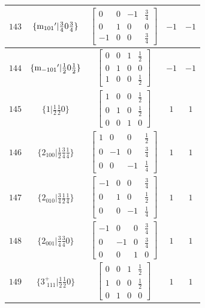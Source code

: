 \documentclass[fleqn,8pt]{jsarticle}
\begin{document}
\begin{longtable}{ccccc}
$ 143 $ & $ \{{\rm m}_{101}{}'|\frac{3}{4} 0 \frac{3}{4}\} $ & $ \begin{bmatrix} 0 & 0 & -1 & \frac{3}{4} \\ 0 & 1 & 0 & 0 \\ -1 & 0 & 0 & \frac{3}{4} \end{bmatrix} $ & $ -1 $ & $ -1 $ \\ \hline
$ 144 $ & $ \{{\rm m}_{-101}{}'|\frac{1}{2} 0 \frac{1}{2}\} $ & $ \begin{bmatrix} 0 & 0 & 1 & \frac{1}{2} \\ 0 & 1 & 0 & 0 \\ 1 & 0 & 0 & \frac{1}{2} \end{bmatrix} $ & $ -1 $ & $ -1 $ \\ \hline
$ 145 $ & $ \{1|\frac{1}{2} \frac{1}{2} 0\} $ & $ \begin{bmatrix} 1 & 0 & 0 & \frac{1}{2} \\ 0 & 1 & 0 & \frac{1}{2} \\ 0 & 0 & 1 & 0 \end{bmatrix} $ & $ 1 $ & $ 1 $ \\ \hline
$ 146 $ & $ \{2{}_{100}|\frac{1}{2} \frac{3}{4} \frac{1}{4}\} $ & $ \begin{bmatrix} 1 & 0 & 0 & \frac{1}{2} \\ 0 & -1 & 0 & \frac{3}{4} \\ 0 & 0 & -1 & \frac{1}{4} \end{bmatrix} $ & $ 1 $ & $ 1 $ \\ \hline
$ 147 $ & $ \{2{}_{010}|\frac{3}{4} \frac{1}{2} \frac{1}{4}\} $ & $ \begin{bmatrix} -1 & 0 & 0 & \frac{3}{4} \\ 0 & 1 & 0 & \frac{1}{2} \\ 0 & 0 & -1 & \frac{1}{4} \end{bmatrix} $ & $ 1 $ & $ 1 $ \\ \hline
$ 148 $ & $ \{2{}_{001}|\frac{3}{4} \frac{3}{4} 0\} $ & $ \begin{bmatrix} -1 & 0 & 0 & \frac{3}{4} \\ 0 & -1 & 0 & \frac{3}{4} \\ 0 & 0 & 1 & 0 \end{bmatrix} $ & $ 1 $ & $ 1 $ \\ \hline
$ 149 $ & $ \{3^{+}_{\,\,111}|\frac{1}{2} \frac{1}{2} 0\} $ & $ \begin{bmatrix} 0 & 0 & 1 & \frac{1}{2} \\ 1 & 0 & 0 & \frac{1}{2} \\ 0 & 1 & 0 & 0 \end{bmatrix} $ & $ 1 $ & $ 1 $ \\ \hline

\end{longtable}
\end{document}
